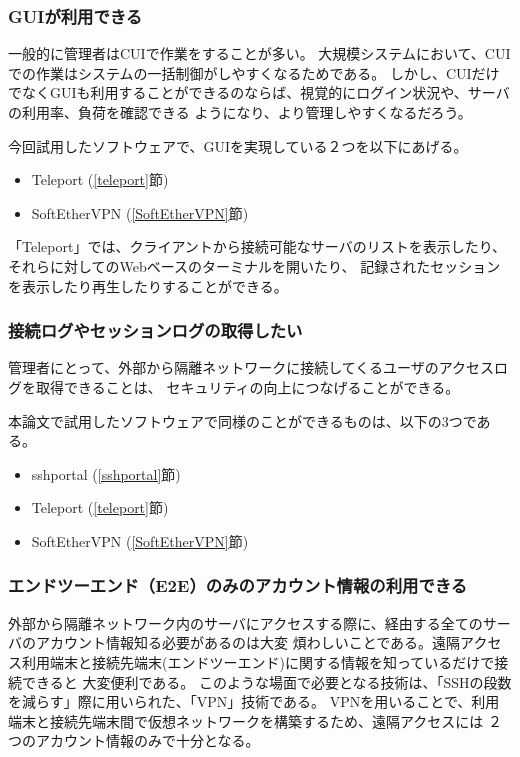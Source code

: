 \documentclass[11pt,a4j,titlepage]{jreport}
\begin{document}
\subsubsection*{GUIが利用できる}
一般的に管理者はCUIで作業をすることが多い。
大規模システムにおいて、CUIでの作業はシステムの一括制御がしやすくなるためである。
しかし、CUIだけでなくGUIも利用することができるのならば、視覚的にログイン状況や、サーバの利用率、負荷を確認できる
ようになり、より管理しやすくなるだろう。
\par 今回試用したソフトウェアで、GUIを実現している２つを以下にあげる。
\begin{itemize}
    \item Teleport (\ref{teleport}節)
    \item SoftEtherVPN (\ref{SoftEtherVPN}節)
\end{itemize}
「Teleport」では、クライアントから接続可能なサーバのリストを表示したり、それらに対してのWebベースのターミナルを開いたり、
記録されたセッションを表示したり再生したりすることができる。


\subsubsection*{接続ログやセッションログの取得したい}
管理者にとって、外部から隔離ネットワークに接続してくるユーザのアクセスログを取得できることは、
セキュリティの向上につなげることができる。

\par 本論文で試用したソフトウェアで同様のことができるものは、以下の3つである。
\begin{itemize}
    \item sshportal (\ref{sshportal}節)
    \item Teleport (\ref{teleport}節)
    \item SoftEtherVPN (\ref{SoftEtherVPN}節)
\end{itemize}


\subsubsection*{エンドツーエンド（E2E）のみのアカウント情報の利用できる}
外部から隔離ネットワーク内のサーバにアクセスする際に、経由する全てのサーバのアカウント情報知る必要があるのは大変
煩わしいことである。遠隔アクセス利用端末と接続先端末(エンドツーエンド)に関する情報を知っているだけで接続できると
大変便利である。
このような場面で必要となる技術は、「SSHの段数を減らす」際に用いられた、「VPN」技術である。
VPNを用いることで、利用端末と接続先端末間で仮想ネットワークを構築するため、遠隔アクセスには
２つのアカウント情報のみで十分となる。
\end{document}
